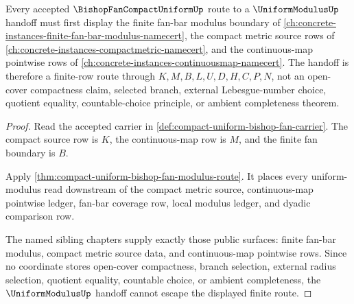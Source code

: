 \begin{theorem}\label{thm:compact-uniform-bishop-fan-nonescape}
Every accepted $\BishopFanCompactUniformUp$ route to a $\UniformModulusUp$ handoff must first display the finite fan-bar modulus boundary of \autoref{ch:concrete-instances-finite-fan-bar-modulus-namecert}, the compact metric source rows of \autoref{ch:concrete-instances-compactmetric-namecert}, and the continuous-map pointwise rows of \autoref{ch:concrete-instances-continuousmap-namecert}. The handoff is therefore a finite-row route through $K,M,B,L,U,D,H,C,P,N$, not an open-cover compactness claim, selected branch, external Lebesgue-number choice, quotient equality, countable-choice principle, or ambient completeness theorem.
\end{theorem}
\begin{proof}
Read the accepted carrier in \autoref{def:compact-uniform-bishop-fan-carrier}. The compact source row is $K$, the continuous-map row is $M$, and the finite fan boundary is $B$.

Apply \autoref{thm:compact-uniform-bishop-fan-modulus-route}. It places every uniform-modulus read downstream of the compact metric source, continuous-map pointwise ledger, fan-bar coverage row, local modulus ledger, and dyadic comparison row.

The named sibling chapters supply exactly those public surfaces: finite fan-bar modulus, compact metric source data, and continuous-map pointwise rows. Since no coordinate stores open-cover compactness, branch selection, external radius selection, quotient equality, countable choice, or ambient completeness, the $\UniformModulusUp$ handoff cannot escape the displayed finite route.
\end{proof}


\begin{closurestatus}{\BishopFanCompactUniformUp}
  \theoryclosure{\seedClosure}
  \formalstatus{\unformalizedV}
\end{closurestatus}
